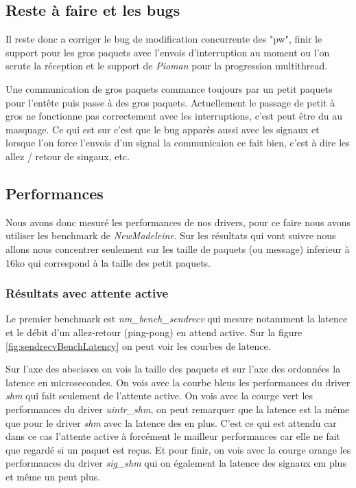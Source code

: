 \subsection{Reste à faire et les bugs}

Il reste donc a corriger le bug de modification concurrente des "pw",
finir le support pour les gros paquets avec l'envois d'interruption au moment ou l'on scrute la réception et
le support de \emph{Pioman} pour la progression multithread.

Une communication de gros paquets commance toujours par un petit paquets pour l'entête puis passe à des gros paquets.
Actuellement le passage de petit à gros ne fonctionne pas correctement avec les interruptions, c'est peut être du au masquage.
Ce qui est sur c'est que le bug apparès aussi avec les signaux et lorsque l'on force l'envois d'un signal la communicaion ce fait bien,
c'est à dire les allez / retour de singaux, etc.

\subsection{Performances}

Nous avons donc mesuré les performances de nos drivers, pour ce faire nous avons utiliser les benchmark de \emph{NewMadeleine}.
Sur les résultats qui vont suivre nous allons nous concentrer seulement sur les taille de paquets (ou message) inferieur à 16ko qui correspond à la taille des petit paquets.

\subsubsection{Résultats avec attente active}

Le premier benchmark est \emph{nm_bench_sendrecv} qui mesure notamment la latence et le débit d'un allez-retour (ping-pong) en attend active.
Sur la figure \ref{fig:sendrecvBenchLatency} on peut voir les courbes de latence.

Sur l'axe des abscisses on vois la taille des paquets et sur l'axe des ordonnées la latence en microsecondes.
On vois avec la courbe bleus les performances du driver \emph{shm} qui fait seulement de l'attente active.
On vois avec la courge vert les performances du driver \emph{uintr_shm}, on peut remarquer que la latence est la même que pour le driver \emph{shm} avec la latence des \uintr{} en plus.
C'est ce qui est attendu car dans ce cas l'attente active à forcément le mailleur performances car elle ne fait que regardé si un paquet est reçus.
Et pour finir, on vois avec la courge orange les performances du driver \emph{sig_shm} qui on également la latence des signaux em plus et même un peut plus.


